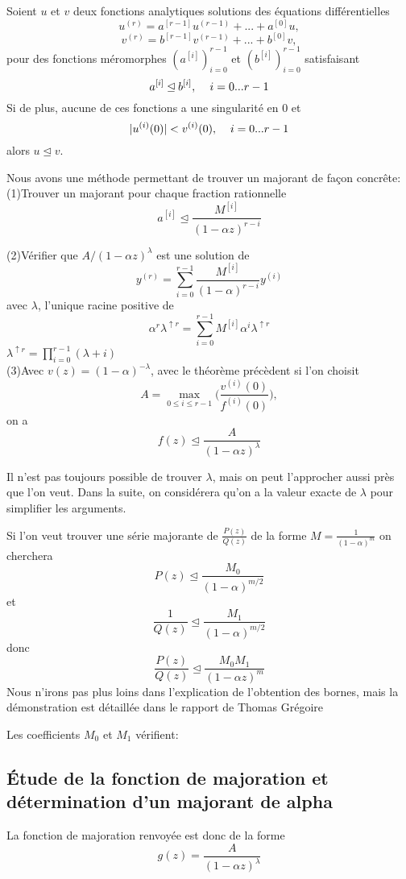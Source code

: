 \documentclass[a4paper,10.5pt]{article}
\begin{document}
	\begin{theorem}
		Soient $u$ et $v$ deux fonctions analytiques solutions des équations différentielles
		\[u^{(r)}=a^{[r-1]}u^{(r-1)}+...+a^{[0]}u,\]
		\[v^{(r)}=b^{[r-1]}v^{(r-1)}+...+b^{[0]}v,\]
		pour des fonctions méromorphes $(a^{[i]})_{i=0}^{r-1}$ et $(b^{[i]})_{i=0}^{r-1}$ satisfaisant 
		\[a^{[i]} \unlhd b^{[i]}, \hspace{4mm} i=0...r-1\]
		Si de plus, aucune de ces fonctions a une singularité en 0 et
		\[|u^{(i)}(0)|<v^{(i)}(0),\hspace{4mm} i=0...r-1\] 
		alors $u\unlhd v$.
	\end{theorem}
	Nous avons une méthode permettant de trouver un majorant de façon concrête:\\
	
	(1)Trouver un majorant pour chaque fraction rationnelle 
	\[a^{[i]} \unlhd \frac{M^{[i]}}{(1-\alpha z)^{r-i}}\]
	
	(2)Vérifier que $A/(1-\alpha z)^\lambda$ est une solution de 
	\[y^{(r)}=\sum_{i=0}^{r-1}\frac{M^{[i]}}{(1-\alpha)^{r-i}}y^{(i)}\]
	avec $\lambda$, l'unique racine positive de\[\alpha^{r}\lambda^{\uparrow r}=\sum_{i=0}^{r-1}{M^{[i]}}\alpha^i\lambda^{\uparrow r} \]
	$\lambda^{\uparrow r}=\prod_{i=0}^{r-1}(\lambda+i)$\\
	
	(3)Avec $v(z)=(1-\alpha)^{-\lambda}$, avec le théorème précèdent si l'on choisit
	\[A=\max_{0\leq i\leq r-1}\Big(\frac{v^{(i)}(0)}{f^{(i)}(0)}\Big),\]
	on a
	\[f(z)\unlhd  \frac{A}{(1-\alpha z)^\lambda}\]
	
	Il n'est pas toujours possible de trouver $\lambda$, mais on peut l'approcher aussi près que l'on veut. Dans la suite, on considérera qu'on a la valeur exacte de $\lambda$ pour simplifier les arguments.
	
	Si l'on veut trouver une série majorante de $\frac{P(z)}{Q(z)}$ de la forme $M=\frac{1}{(1-\alpha)^m}$ on cherchera 
	\[P(z)\unlhd \frac{M_0}{(1-\alpha)^{m/2}}\]
	et 
	\[\frac{1}{Q(z)}\unlhd \frac{M_1}{(1-\alpha)^{m/2}}\]
	donc 
	\[\frac{P(z)}{Q(z)}\unlhd \frac{M_0M_1}{(1-\alpha z)^{m}}\]
	Nous n'irons pas plus loins dans l'explication de l'obtention des bornes, mais la démonstration est détaillée dans le rapport de Thomas Grégoire
	
	Les coefficients $M_0$ et $M_1$ vérifient:
	
	
	
	
	\subsection{Étude de la fonction de majoration et détermination d'un majorant de alpha}
	La fonction de majoration renvoyée est donc de la  forme
	\[g(z)=\frac{A}{(1-\alpha z)^{\lambda}}\]
	
\end{document}
